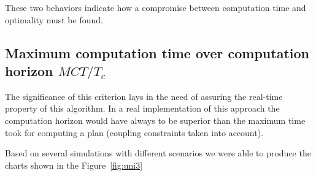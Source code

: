 \documentclass[eprint]{actapoly}
\begin{document}
These two behaviors indicate how a compromise between computation time and optimality must be found.


\subsection{Maximum computation time over computation horizon $MCT/T_c$}

The significance of this criterion lays in the need of assuring the 
real-time property of this algorithm.
In a real implementation of this approach the computation horizon would have 
always to be superior than the
maximum time took for computing a plan (coupling constraints
taken into account).

Based on several simulations with different scenarios we were able to
produce the charts shown in the Figure~\ref{fig:uni3}
\end{document}
